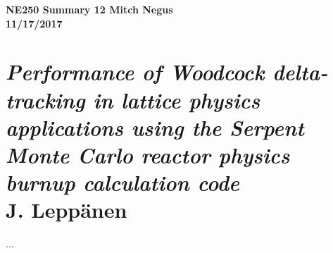\documentclass{report}
\newcommand{\tab}{\-\hspace{1cm}}
\begin{document}
\thispagestyle{empty}

{\bf {\large {NE250 Summary 12} \hfill Mitch Negus\\
		\hspace*{\fill} 11/17/2017\\ }}
\section*{\textsl{Performance of Woodcock delta-tracking in lattice physics applications using the Serpent Monte Carlo reactor physics burnup calculation code} \\ \normalsize J. Lepp\"{a}nen}

\tab ...
\end{document}

